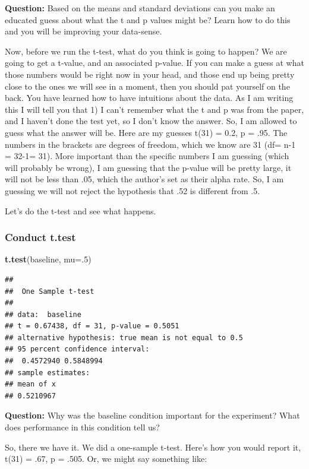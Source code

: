 \documentclass[]{book}
\newenvironment{Shaded}{\begin{snugshade}}{\end{snugshade}}
\newcommand{\KeywordTok}[1]{\textcolor[rgb]{0.13,0.29,0.53}{\textbf{{#1}}}}
\newcommand{\DataTypeTok}[1]{\textcolor[rgb]{0.13,0.29,0.53}{{#1}}}
\newcommand{\DecValTok}[1]{\textcolor[rgb]{0.00,0.00,0.81}{{#1}}}
\newcommand{\NormalTok}[1]{{#1}}
\theoremstyle{definition}
\theoremstyle{definition}
\theoremstyle{definition}
\theoremstyle{remark}
\begin{document}
\textbf{Question:} Based on the means and standard deviations can you
make an educated guess about what the t and p values might be? Learn how
to do this and you will be improving your data-sense.

Now, before we run the t-test, what do you think is going to happen? We
are going to get a t-value, and an associated p-value. If you can make a
guess at what those numbers would be right now in your head, and those
end up being pretty close to the ones we will see in a moment, then you
should pat yourself on the back. You have learned how to have intuitions
about the data. As I am writing this I will tell you that 1) I can't
remember what the t and p was from the paper, and I haven't done the
test yet, so I don't know the answer. So, I am allowed to guess what the
answer will be. Here are my guesses t(31) = 0.2, p = .95. The numbers in
the brackets are degrees of freedom, which we know are 31 (df= n-1 =
32-1= 31). More important than the specific numbers I am guessing (which
will probably be wrong), I am guessing that the p-value will be pretty
large, it will not be less than .05, which the author's set as their
alpha rate. So, I am guessing we will not reject the hypothesis that .52
is different from .5.

Let's do the t-test and see what happens.

\subsubsection{Conduct t.test}\label{conduct-t.test}

\begin{Shaded}
\begin{Highlighting}[]
\KeywordTok{t.test}\NormalTok{(baseline, }\DataTypeTok{mu=}\NormalTok{.}\DecValTok{5}\NormalTok{)}
\end{Highlighting}
\end{Shaded}

\begin{verbatim}
## 
##  One Sample t-test
## 
## data:  baseline
## t = 0.67438, df = 31, p-value = 0.5051
## alternative hypothesis: true mean is not equal to 0.5
## 95 percent confidence interval:
##  0.4572940 0.5848994
## sample estimates:
## mean of x 
## 0.5210967
\end{verbatim}

\textbf{Question:} Why was the baseline condition important for the
experiment? What does performance in this condition tell us?

So, there we have it. We did a one-sample t-test. Here's how you would
report it, t(31) = .67, p = .505. Or, we might say something like:
\end{document}
